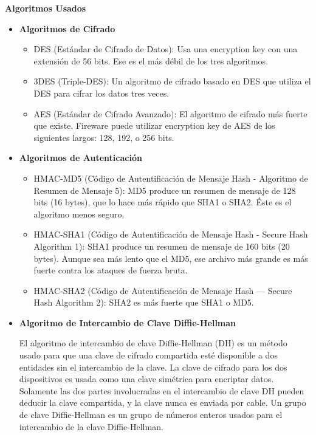 \documentclass[a4paper,12pt]{article}
\begin{document}
\begin{large}
 \textbf{Algoritmos Usados}
\end{large}
  \begin{itemize}
   \item \textbf{Algoritmos de Cifrado}
   \begin{itemize}
    \item DES (Estándar de Cifrado de Datos): Usa una encryption key con una extensión de 56 bits. Ese es el más débil de los tres algoritmos.
    \item 3DES (Triple-DES): Un algoritmo de cifrado basado en DES que utiliza el DES para cifrar los datos tres veces.
    \item AES (Estándar de Cifrado Avanzado): El algoritmo de cifrado más fuerte que existe. Fireware puede utilizar encryption key de AES de los siguientes largos: 128, 192, o 256 bits.
   \end{itemize}
   \item \textbf{Algoritmos de Autenticación}
   \begin{itemize}
    \item HMAC-MD5 (Código de Autentificación de Mensaje Hash - Algoritmo de Resumen de Mensaje 5): MD5 produce un resumen de mensaje de 128 bits (16 bytes), que lo hace más rápido que SHA1 o SHA2. Éste es el algoritmo menos seguro.
    \item HMAC-SHA1 (Código de Autentificación de Mensaje Hash - Secure Hash Algorithm 1): SHA1 produce un resumen de mensaje de 160 bits (20 bytes). Aunque sea más lento que el MD5, ese archivo más grande es más fuerte contra los ataques de fuerza bruta.
    \item HMAC-SHA2 (Código de Autentificación de Mensaje Hash — Secure Hash Algorithm 2): SHA2 es más fuerte que SHA1 o MD5.
   \end{itemize}
   \item \textbf{Algoritmo de Intercambio de Clave Diffie-Hellman} \par
   El algoritmo de intercambio de clave Diffie-Hellman (DH) es un método usado para que una clave de cifrado compartida esté disponible a dos entidades sin el intercambio de la clave. La clave de cifrado para los dos dispositivos es usada como una clave simétrica para encriptar datos. Solamente las dos partes involucradas en el intercambio de clave DH pueden deducir la clave compartida, y la clave nunca es enviada por cable.
   Un grupo de clave Diffie-Hellman es un grupo de números enteros usados para el intercambio de la clave Diffie-Hellman.
   
  \end{itemize}
\end{document}
